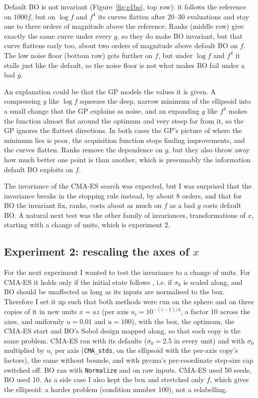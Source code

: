 \documentclass[12pt,a4paper]{article}
\begin{document}
Default BO is not invariant (Figure~\ref{fig:e1bo}, top row): it follows the reference on \(1000f\), but on \(\log f\) and \(f^{4}\) its curves flatten after 20--30 evaluations and stay one to three orders of magnitude above the reference. Ranks (middle row) give exactly the same curve under every \(g\), so they do make BO invariant, but that curve flattens early too, about two orders of magnitude above default BO on \(f\). The low noise floor (bottom row) gets further on \(f\), but under \(\log f\) and \(f^{4}\) it stalls just like the default, so the noise floor is not what makes BO fail under a bad \(g\).

An explanation could be that the GP models the values it is given. A compressing \(g\) like \(\log f\) squeezes the deep, narrow minimum of the ellipsoid into a small change that the GP explains as noise, and an expanding \(g\) like \(f^{4}\) makes the function almost flat around the optimum and very steep far from it, so the GP ignores the flattest directions. In both cases the GP's picture of where the minimum lies is poor, the acquisition function stops finding improvements, and the curves flatten. Ranks remove the dependence on \(g\), but they also throw away how much better one point is than another, which is presumably the information default BO exploits on \(f\).

The invariance of the CMA-ES search was expected, but I was surprised that the invariance breaks in the stopping rule instead, by about 8 orders, and that for BO the invariant fix, ranks, costs about as much on \(f\) as a bad \(g\) costs default BO. A natural next test was the other family of invariances, transformations of \(x\), starting with a change of units, which is experiment 2.

\subsection{\texorpdfstring{Experiment 2: rescaling the axes of \(x\)}{Experiment 2: rescaling the axes of x}}

For the next experiment I wanted to test the invariance to a change of units. For CMA-ES it holds only if the initial state follows \cite{hansen2016}, i.e. if \(\sigma_{0}\) is scaled along, and BO should be unaffected as long as its inputs are normalised to the box. Therefore I set it up such that both methods were run on the sphere and on three copies of it in new units \(x = uz\) (per axis \(u_{i} = 10^{- (i - 1)/4}\), a factor 10 across the axes, and uniformly \(u = 0.01\) and \(u = 100\)), with the box, the optimum, the CMA-ES start and BO's Sobol design mapped along, so that each copy is the same problem. CMA-ES ran with its defaults (\(\sigma_{0} = 2.5\) in every unit) and with \(\sigma_{0}\) multiplied by \(u_{i}\) per axis (\texttt{CMA\_stds}, on the ellipsoid with the per-axis copy's factors), the same without bounds, and with pycma's per-coordinate step-size cap switched off. BO ran with \texttt{Normalize} and on raw inputs. CMA-ES used 50 seeds, BO used 10. As a side case I also kept the box and stretched only \(f\), which gives the ellipsoid: a harder problem (condition number 100), not a relabelling.
\end{document}
